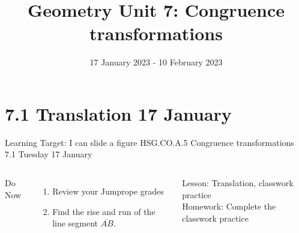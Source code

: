 \documentclass[onlytextwidth, aspectratio=169]{beamer}
\title{Geometry Unit 7: Congruence transformations}
\date{17 January 2023 - 10 February 2023}
\begin{document}
\frame{\titlepage}
\section[Outline]{}
\frame{\tableofcontents}

\section{7.1 Translation \hfill 17 January \,}
\begin{frame}{Learning Target: I can slide a figure}
  {HSG.CO.A.5 Congruence transformations \hfill \alert{7.1 Tuesday 17 January}}
  \begin{columns}
    Do Now
    \begin{enumerate}
      \item Review your Jumprope grades
      \item Find the rise and run of the line segment $\overline{AB}$.
    \end{enumerate}
    Lesson: Translation, classwork practice \\
    Homework: Complete the classwork practice
    \begin{flushright}
    \end{flushright}
  \end{columns}
\end{frame}
\end{document}
